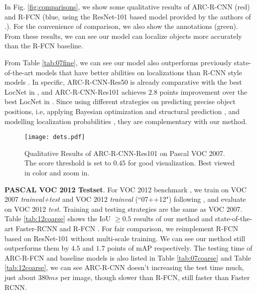 \documentclass[10pt,twocolumn,letterpaper]{article}
\begin{document}
In Fig. \ref{fig:comparisons}, we show some qualitative results of ARC-R-CNN (red) and R-FCN (blue, using the ResNet-101 based model provided by the authors of \cite{rfcn}.). For the convenience of comparison, we also show the annotations (green). From these results, we can see our model can localize objects more accurately than the R-FCN baseline.

From Table \ref{tab:07fine}, we can see our model also outperforms previously state-of-the-art models that have better abilities on localizations than R-CNN style models \cite{rcnn,fast_rcnn,faster_rcnn}. In specific, ARC-R-CNN-Res50 is already comparative with the best LocNet in \cite{locNet}, and ARC-R-CNN-Res101 achieves $2.8$ points improvement over the best LocNet in \cite{locNet}.
Since \cite{yuting, locNet} using different strategies on predicting precise object positions, i.e, applying Bayesian optimization and structural prediction \cite{yuting}, and modelling localization probabilities \cite{locNet}, they are complementary with our method. 



\begin{figure*}
\centering
{\texttt{[image: dets.pdf]}}
\caption{Qualitative Results of ARC-R-CNN-Res101 on Pascal VOC 2007. The score threshold is set to $0.45$ for good visualization. Best viewed in color and zoom in. \vspace{-4mm} }
\label{fig:dets}
\vspace{-1mm}
\end{figure*} 

\textbf{PASCAL VOC 2012 Testset}.
For VOC 2012 benchmark \cite{pascal}, we train on VOC 2007 \textit{trainval+test} and VOC 2012 \textit{trainval} (``07++12") following \cite{faster_rcnn,rfcn}, and evaluate on VOC 2012 \textit{test}. 
Training and testing strategies are the same as VOC 2007.
Table \ref{tab:12coarse} shows the IoU $\ge 0.5$ results of our method and state-of-the-art Faster-RCNN \cite{faster_rcnn,resNet} and R-FCN \cite{rfcn}.
For fair comparison, we reimplement R-FCN based on ResNet-101 without multi-scale training. 
We can see our method still outperforms them by $4.5$ and $1.7$ points of mAP respectively. 
The testing time of ARC-R-FCN and baseline models is also listed in Table \ref{tab:07coarse} and Table \ref{tab:12coarse}, we can see ARC-R-CNN doesn't increasing the test time much, just about $380ms$ per image, though slower than R-FCN, still faster than Faster RCNN.
\end{document}
